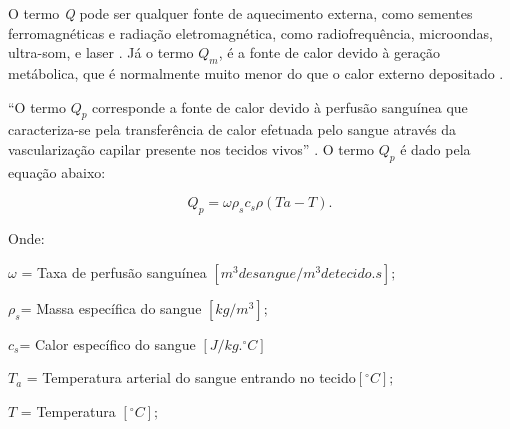  O termo {\itshape Q} pode ser qualquer fonte de aquecimento externa, como sementes ferromagnéticas e radiação eletromagnética, como radiofrequência, microondas, ultra-som, e laser \cite[p.10]{Giselle}. Já o termo {\itshape $Q_{m}$}, é a  fonte de calor devido à geração metábolica, que é normalmente muito menor do que o calor externo depositado . %

       ``O termo {\itshape $Q_{p}$} corresponde a fonte de calor devido à perfusão sanguínea que caracteriza-se pela transferência de calor efetuada pelo sangue através da vascularização capilar presente nos tecidos vivos'' \cite[p.8]{Carla}.%
       O termo   {\itshape $Q_{p}$} é dado pela equação abaixo:


    \begin{equation} Q_{p}= \omega\rho_{s}c_{s}\rho(Ta-T).\end{equation} 

       Onde:

       $\omega$ = Taxa de perfusão sanguínea $[m^3 de sangue/m^3 de tecido.s];$

      $ \rho_{s} $= Massa específica do sangue $[kg/m^3];$

        $c_{s} $= Calor específico do sangue  $[J/kg.^{\circ}C]$

        $T_{a}$ = Temperatura arterial do sangue entrando no tecido$ [^{\circ}C];$

      $T$ = Temperatura  $[^{\circ}C];$









